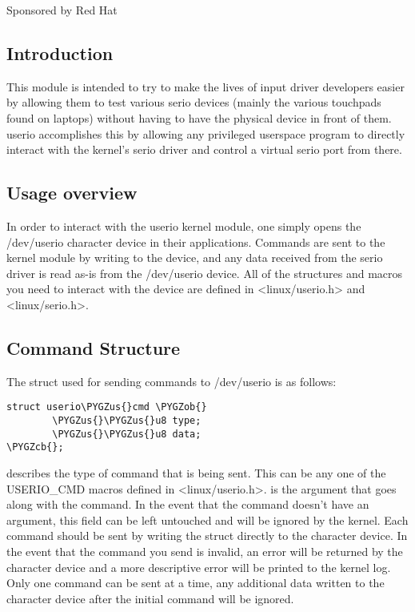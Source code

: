 \documentclass[a4paper,8pt,english]{sphinxmanual}
\def\PYGZus{\char`\_}
\def\PYGZob{\char`\{}
\def\PYGZcb{\char`\}}
\begin{document}
Sponsored by Red Hat


\subsection{Introduction}
\label{input/userio:introduction}
This module is intended to try to make the lives of input driver developers
easier by allowing them to test various serio devices (mainly the various
touchpads found on laptops) without having to have the physical device in front
of them. userio accomplishes this by allowing any privileged userspace program
to directly interact with the kernel's serio driver and control a virtual serio
port from there.


\subsection{Usage overview}
\label{input/userio:usage-overview}
In order to interact with the userio kernel module, one simply opens the
/dev/userio character device in their applications. Commands are sent to the
kernel module by writing to the device, and any data received from the serio
driver is read as-is from the /dev/userio device. All of the structures and
macros you need to interact with the device are defined in \textless{}linux/userio.h\textgreater{} and
\textless{}linux/serio.h\textgreater{}.


\subsection{Command Structure}
\label{input/userio:command-structure}
The struct used for sending commands to /dev/userio is as follows:

\begin{Verbatim}[commandchars=\\\{\}]
struct userio\PYGZus{}cmd \PYGZob{}
        \PYGZus{}\PYGZus{}u8 type;
        \PYGZus{}\PYGZus{}u8 data;
\PYGZcb{};
\end{Verbatim}

 describes the type of command that is being sent. This can be any one
of the USERIO\_CMD macros defined in \textless{}linux/userio.h\textgreater{}.  is the argument
that goes along with the command. In the event that the command doesn't have an
argument, this field can be left untouched and will be ignored by the kernel.
Each command should be sent by writing the struct directly to the character
device. In the event that the command you send is invalid, an error will be
returned by the character device and a more descriptive error will be printed
to the kernel log. Only one command can be sent at a time, any additional data
written to the character device after the initial command will be ignored.
\end{document}
